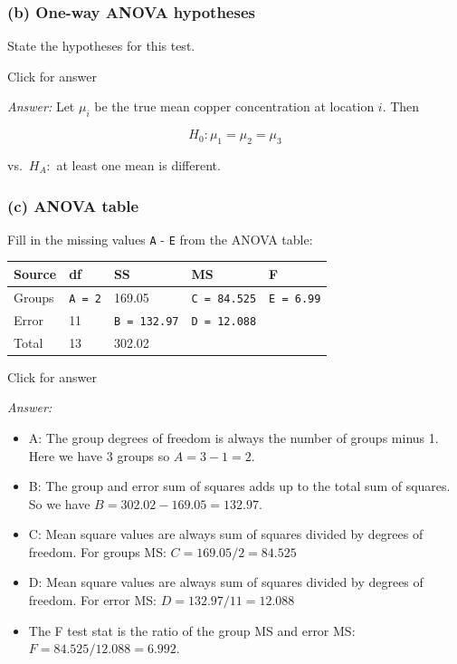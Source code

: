\documentclass[
]{book}
\begin{document}
\hypertarget{b-one-way-anova-hypotheses}{%
\subsubsection{(b) One-way ANOVA hypotheses}\label{b-one-way-anova-hypotheses}}

State the hypotheses for this test.

Click for answer

\emph{Answer:} Let \(\mu_i\) be the true mean copper concentration at location \(i\). Then

\[
H_0: \mu_{1} = \mu_{2} = \mu_{3} 
\]

vs.~\(H_A:\) at least one mean is different.

\hypertarget{c-anova-table}{%
\subsubsection{(c) ANOVA table}\label{c-anova-table}}

Fill in the missing values \texttt{A} - \texttt{E} from the ANOVA table:

\begin{longtable}[]{@{}lllll@{}}
\toprule()
Source & df & SS & MS & F \\
\midrule()
\endhead
Groups & \texttt{A\ =\ 2} & 169.05 & \texttt{C\ =\ 84.525} & \texttt{E\ =\ 6.99} \\
Error & 11 & \texttt{B\ =\ 132.97} & \texttt{D\ =\ 12.088} & \\
Total & 13 & 302.02 & & \\
\bottomrule()
\end{longtable}

Click for answer

\emph{Answer:}

\begin{itemize}
\item
  A: The group degrees of freedom is always the number of groups minus 1. Here we have 3 groups so \(A = 3-1=2\).
\item
  B: The group and error sum of squares adds up to the total sum of squares. So we have \(B = 302.02 - 169.05 = 132.97\).
\item
  C: Mean square values are always sum of squares divided by degrees of freedom. For groups MS: \(C = 169.05/2 = 84.525\)
\item
  D: Mean square values are always sum of squares divided by degrees of freedom. For error MS: \(D = 132.97/11 = 12.088\)
\item
  The F test stat is the ratio of the group MS and error MS: \(F = 84.525/12.088 = 6.992\).
\end{itemize}
\end{document}
